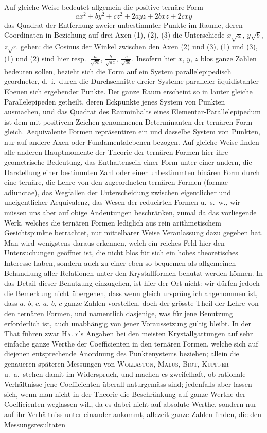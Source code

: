 \documentclass[12pt,a4paper]{article}
\begin{document}
Auf gleiche Weise bedeutet allgemein die positive tern\"{a}re Form
\[
ax^2+by^2+cz^2+2ayz+2bxz+2cxy
\]
das Quadrat der Entfernung zweier unbestimmter Punkte im Raume, deren Coordinaten in Beziehung auf drei Axen (1), (2), (3) die Unterschiede $x\sqrt{a}$, $y\sqrt{b}$, $z\sqrt{c}$ geben: die Cosinus der Winkel zwischen den Axen (2) und (3), (1) und (3), (1) und (2) sind hier resp.~$\frac{a}{\sqrt{bc}}$, $\frac{b}{\sqrt{ac}}$, $\frac{c}{\sqrt{ab}}$. Insofern hier $x$, $y$, $z$ blos ganze Zahlen bedeuten sollen, bezieht sich die Form auf ein System parallelepipedisch geordneter, d.~i.~durch die Durchschnitte dreier Systeme paralleler \"{a}quidistanter Ebenen sich ergebender Punkte. Der ganze Raum erscheint so in lauter gleiche Parallelepipeden getheilt, deren Eckpunkte jenes System von Punkten ausmachen, und das Quadrat des Rauminhalts eines Elementar-Parallelepipedum ist dem mit positivem Zeichen genommenen Determinanten der tern\"{a}ren Form gleich. Aequivalente Formen repr\"{a}sentiren ein und dasselbe System von Punkten, nur auf andere Axen oder Fundamentalebenen bezogen. Auf gleiche Weise finden alle anderen Hauptmomente der Theorie der tern\"{a}ren Formen hier ihre geometrische Bedeutung, das Enthaltensein einer Form unter einer andern, die Darstellung einer bestimmten Zahl oder einer unbestimmten bin\"{a}ren Form durch eine tern\"{a}re, die Lehre von den zugeordneten tern\"{a}ren Formen (formae adiunctae), das Wegfallen der Unterscheidung zwischen eigentlicher und uneigentlicher Aequivalenz, das Wesen der reducirten Formen u.~s.~w., wir m\"{u}ssen uns aber auf obige Andeutungen beschr\"{a}nken, zumal da das vorliegende Werk, welches die tern\"{a}ren Formen lediglich aus rein arithmetischem Gesichtspunkte betrachtet, nur mittelbarer Weise Veranlassung dazu gegeben hat. Man wird wenigstens daraus erkennen, welch ein reiches Feld hier den Untersuchungen ge\"{o}ffnet ist, die nicht blos f\"{u}r sich ein hohes theoretisches Interesse haben, sondern auch zu einer eben so bequemen als allgemeinen Behandlung aller Relationen unter den Krystallformen benutzt werden k\"{o}nnen. In das Detail dieser Benutzung einzugehen, ist hier der Ort nicht: wir d\"{u}rfen jedoch die Bemerkung nicht \"{u}bergehen, dass wenn gleich urspr\"{u}nglich angenommen ist, dass $a$, $b$, $c$, $a$, $b$, $c$ ganze Zahlen vorstellen, doch der gr\"{o}sste Theil der Lehre von den tern\"{a}ren Formen, und namentlich dasjenige, was f\"{u}r jene Benutzung erforderlich ist, auch unabh\"{a}ngig von jener Voraussetzung g\"{u}ltig bleibt. In der That f\"{u}hren zwar \textsc{Ha\"{u}y}'s Angaben bei den meisten Krystallgattungen auf sehr einfache ganze Werthe der Coefficienten in den tern\"{a}ren Formen, welche sich auf diejenen entsprechende Anordnung des Punktenystems beziehen; allein die genaueren sp\"{a}teren Messungen von \textsc{Wollaston}, \textsc{Malus}, \textsc{Biot}, \textsc{Kupffer} u.~a.~stehen damit im Widerspruch, und machen es zweifelhaft, ob rationale Verh\"{a}ltnisse jene Coefficienten \"{u}berall naturgem\"{a}ss sind; jedenfalls aber lassen sich, wenn man nicht in der Theorie die Beschr\"{a}nkung auf ganze Werthe der Coefficienten weglassen will, da es dabei nicht auf absolute Werthe, sondern nur auf ihr Verh\"{a}ltniss unter einander ankommt, allezeit ganze Zahlen finden, die den Messungsresultaten 
\end{document}
